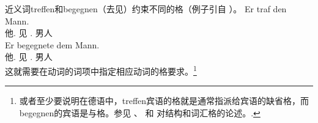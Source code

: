 \begin{exe}
\begin{xlist}[iv.]
\begin{exe}
\begin{xlist}[iv.]
\zl
近义词treffen和begegnen（去见）约束不同的格（例子引自 \citet[]{ps}）。
\eal
\ex 
\gll Er traf den Mann.\\
     他.\nom{} 见 .\acc{} 男人\\
\ex 
\gll Er begegnete dem Mann.\\
     他.\nom{} 见 .\dat{} 男人\\
\zl
这就需要在动词的词项中指定相应动词的格要求。\footnote{%
  或者至少要说明在德语中，treffen宾语的格就是通常指派给宾语的缺省格，而begegnen的宾语是与格。参见 、 和 对结构和词汇格的论述。.
}
%


\end{xlist}
\end{exe}
\end{xlist}
\end{exe}
